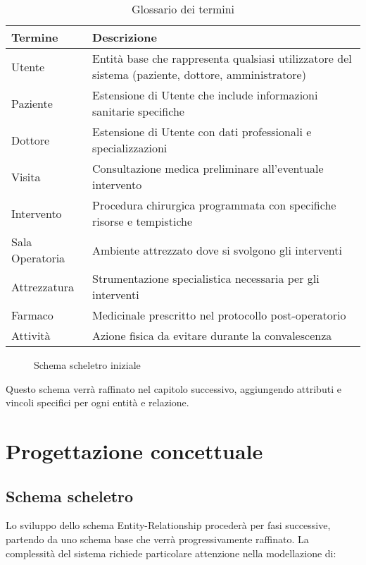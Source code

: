 \documentclass[12pt,a4paper]{report}
\begin{document}
\begin{table}[H]
\caption{Glossario dei termini}
\begin{tabular}{p{3cm}p{12cm}}
\toprule
\textbf{Termine} & \textbf{Descrizione} \\
\midrule
Utente & Entità base che rappresenta qualsiasi utilizzatore del sistema (paziente, dottore, amministratore) \\
Paziente & Estensione di Utente che include informazioni sanitarie specifiche \\
Dottore & Estensione di Utente con dati professionali e specializzazioni \\
Visita & Consultazione medica preliminare all'eventuale intervento \\
Intervento & Procedura chirurgica programmata con specifiche risorse e tempistiche \\
Sala Operatoria & Ambiente attrezzato dove si svolgono gli interventi \\
Attrezzatura & Strumentazione specialistica necessaria per gli interventi \\
Farmaco & Medicinale prescritto nel protocollo post-operatorio \\
Attività & Azione fisica da evitare durante la convalescenza \\
\bottomrule
\end{tabular}
\end{table}

\begin{figure}[H]
\caption{Schema scheletro iniziale}
\centering
\end{figure}

Questo schema verrà raffinato nel capitolo successivo, aggiungendo attributi e vincoli specifici per ogni entità e relazione.

\chapter{Progettazione concettuale}

\section{Schema scheletro}
Lo sviluppo dello schema Entity-Relationship procederà per fasi successive, partendo da uno schema base che verrà progressivamente raffinato. La complessità del sistema richiede particolare attenzione nella modellazione di:
\end{document}
